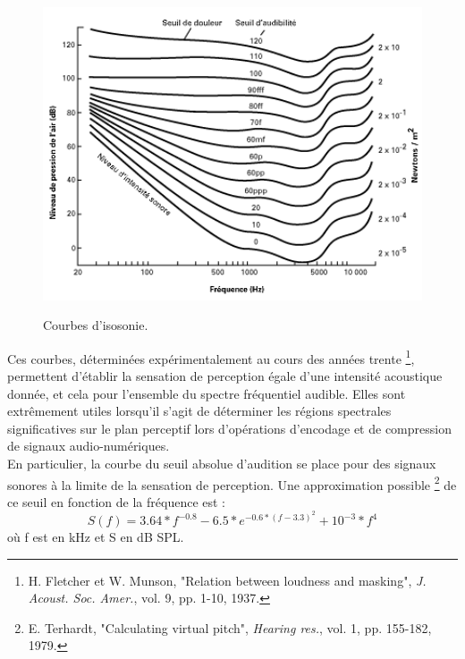 \begin{figure}[h]
    \bigskip
    \centering
    \includegraphics[width=12cm]{figures/isosonie.png}\\
    \caption{Courbes d'isosonie.}
    \label{isosonie}
    \bigskip
\end{figure}

Ces courbes, d{\'e}termin{\'e}es exp{\'e}rimentalement au cours des ann{\'e}es
trente \footnote{H. Fletcher et W. Munson, "Relation between
loudness and masking", \emph{J. Acoust. Soc. Amer.}, vol. 9, pp.
1-10, 1937.}, permettent d'{\'e}tablir la sensation de perception
{\'e}gale d'une intensit{\'e} acoustique donn{\'e}e, et cela pour l'ensemble
du spectre fr{\'e}quentiel audible. Elles sont extr{\^e}mement utiles
lorsqu'il s'agit de d{\'e}terminer les r{\'e}gions spectrales
significatives sur le plan perceptif lors d'op{\'e}rations d'encodage
et de compression de signaux audio-num{\'e}riques.\\

En particulier, la courbe du seuil absolue d'audition se place
pour des signaux sonores {\`a} la limite de la sensation de
perception. Une approximation possible \footnote{E. Terhardt,
"Calculating virtual pitch", \emph{Hearing res.}, vol. 1, pp.
155-182, 1979.} de ce seuil en fonction de la fr{\'e}quence est :
$$ S(f) = 3.64*f^{-0.8} - 6.5*e^{-0.6*(f-3.3)^{2}} + 10^{-3}*f^{4} $$
o{\`u} f est en kHz et S en dB SPL.


\newpage
